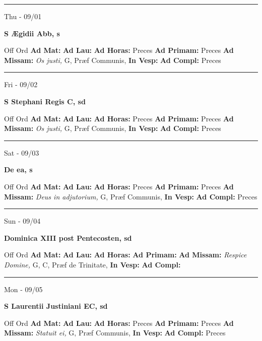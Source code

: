 \documentclass[letterpaper, 10pt]{article}
\begin{document}
\hrule
\begin{center}
Thu - 09/01
\end{center}\textbf{ \large S Ægidii Abb, \textnormal{\normalsize s}}
\begin{justify}
Off Ord
\textbf{Ad Mat: }
\textbf{Ad Lau: }
\textbf{Ad Horas: }Preces
\textbf{Ad Primam: }Preces
\textbf{Ad Missam:} \textit{Os justi, } G, Præf Communis, 
\textbf{In Vesp: }
\textbf{Ad Compl: }Preces\end{justify}



\hrule
\begin{center}
Fri - 09/02
\end{center}\textbf{ \large S Stephani Regis C, \textnormal{\normalsize sd}}
\begin{justify}
Off Ord
\textbf{Ad Mat: }
\textbf{Ad Lau: }
\textbf{Ad Horas: }Preces
\textbf{Ad Primam: }Preces
\textbf{Ad Missam:} \textit{Os justi, } G, Præf Communis, 
\textbf{In Vesp: }
\textbf{Ad Compl: }Preces\end{justify}



\hrule
\begin{center}
Sat - 09/03
\end{center}\textbf{ \large De ea, \textnormal{\normalsize s}}
\begin{justify}
Off Ord
\textbf{Ad Mat: }
\textbf{Ad Lau: }
\textbf{Ad Horas: }Preces
\textbf{Ad Primam: }Preces
\textbf{Ad Missam:} \textit{Deus in adjutorium, } G, Præf Communis, 
\textbf{In Vesp: }
\textbf{Ad Compl: }Preces\end{justify}



\hrule
\begin{center}
Sun - 09/04
\end{center}\textbf{ \large Dominica XIII post Pentecosten, \textnormal{\normalsize sd}}
\begin{justify}
Off Ord
\textbf{Ad Mat: }
\textbf{Ad Lau: }
\textbf{Ad Horas: }
\textbf{Ad Primam: }
\textbf{Ad Missam:} \textit{Respice Domine, } G, C, Præf de Trinitate, 
\textbf{In Vesp: }
\textbf{Ad Compl: }\end{justify}



\hrule
\begin{center}
Mon - 09/05
\end{center}\textbf{ \large S Laurentii Justiniani EC, \textnormal{\normalsize sd}}
\begin{justify}
Off Ord
\textbf{Ad Mat: }
\textbf{Ad Lau: }
\textbf{Ad Horas: }Preces
\textbf{Ad Primam: }Preces
\textbf{Ad Missam:} \textit{Statuit ei, } G, Præf Communis, 
\textbf{In Vesp: }
\textbf{Ad Compl: }Preces\end{justify}
\end{document}

